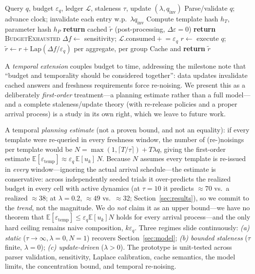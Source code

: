 \documentclass[sigconf,nonacm]{acmart}
\newcommand{\eps}{\varepsilon}
\newcommand{\E}{\mathbb{E}}
\newcommand{\Lap}{\mathrm{Lap}}
\begin{document}
\begin{algorithm}[t]
\caption{Workload-aware DP middleware (one query).}
\label{alg:full}
\begin{algorithmic}[1]
\REQUIRE Query $q$, budget $\eps_q$, ledger $\mathcal L$, staleness $\tau$, update $(\lambda,q_{\mathrm{inv}})$
\STATE Parse/validate $q$; advance clock; invalidate each entry w.p.\ $\lambda q_{\mathrm{inv}}$
\STATE Compute template hash $h_T$, parameter hash $h_P$
   \STATE \textbf{return} cached $\tilde r$ \hfill {\small (post-processing, $\Delta\eps{=}0$)}
\ENDIF
\IF{$\mathcal L.\mathrm{remaining}<\eps_q$} \STATE \textbf{return} \textsc{BudgetExhausted} \ENDIF
\STATE $\Delta f\gets$ sensitivity; $\mathcal L.\mathrm{consumed}\mathrel{+}=\eps_q$
\STATE $r\gets$ execute $q$; $\tilde r\gets r+\Lap(\Delta f/\eps_q)$ per aggregate, per group
\STATE Cache and \textbf{return} $\tilde r$
\end{algorithmic}
\end{algorithm}

A \emph{temporal extension} couples budget to time, addressing the milestone note that ``budget and temporality should be considered together'': data updates invalidate cached answers and freshness requirements force re-noising. We present this as a deliberately \emph{first-order} treatment---a planning estimate rather than a full model---and a complete staleness/update theory (with re-release policies and a proper arrival process) is a study in its own right, which we leave to future work.

A temporal \emph{planning estimate} (not a proven bound, and not an equality): if every template were re-queried in every freshness window, the number of (re-)noisings per template would be $N=\max(1,\lceil T/\tau\rceil)+T\lambda q$, giving the first-order estimate $\E[\eps_{\mathrm{temp}}]\approx\eps_q\,\E[u_k]\,N$. Because $N$ assumes every template is re-issued in \emph{every} window---ignoring the actual arrival schedule---the estimate is conservative: across independently seeded trials it over-predicts the realized budget in every cell with active dynamics (at $\tau{=}10$ it predicts ${\approx}70$ vs.\ a realized ${\approx}38$; at $\lambda{=}0.2$, ${\approx}49$ vs.\ ${\approx}32$; Section~\ref{sec:results}), so we commit to the \emph{trend}, not the magnitude. We do \emph{not} claim it as an upper bound---we have no theorem that $\E[\eps_{\mathrm{temp}}]\le\eps_q\E[u_k]N$ holds for every arrival process---and the only hard ceiling remains naive composition, $k\eps_q$. Three regimes slide continuously: \emph{(a) static} ($\tau\to\infty,\lambda{=}0,N{=}1$) recovers Section~\ref{sec:model}; \emph{(b) bounded staleness} ($\tau$ finite, $\lambda{=}0$); \emph{(c) update-driven} ($\lambda{>}0$). The prototype is unit-tested across parser validation, sensitivity, Laplace calibration, cache semantics, the model limits, the concentration bound, and temporal re-noising.
\end{document}
